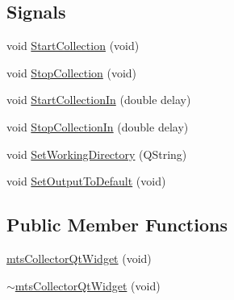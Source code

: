 \subsection*{Signals}
\begin{DoxyCompactItemize}
\item 
void \hyperlink{classmts_collector_qt_widget_a0d2f433d3246d55d80d6f35eae3799e2}{Start\+Collection} (void)
\item 
void \hyperlink{classmts_collector_qt_widget_a08ea3c401e89cc9c65f31611c3cb1b0e}{Stop\+Collection} (void)
\item 
void \hyperlink{classmts_collector_qt_widget_a4a4e7713cddf98ffc22466c9cc57d1d9}{Start\+Collection\+In} (double delay)
\item 
void \hyperlink{classmts_collector_qt_widget_add7cedb03020f4277f05996515584098}{Stop\+Collection\+In} (double delay)
\item 
void \hyperlink{classmts_collector_qt_widget_a451a4f753a956d81690518c67ed55cea}{Set\+Working\+Directory} (Q\+String)
\item 
void \hyperlink{classmts_collector_qt_widget_a381c583eb8f2acae4a7f5426cba3dd60}{Set\+Output\+To\+Default} (void)
\end{DoxyCompactItemize}
\subsection*{Public Member Functions}
\begin{DoxyCompactItemize}
\item 
\hyperlink{classmts_collector_qt_widget_a9870d591db178a3879b23f465f455307}{mts\+Collector\+Qt\+Widget} (void)
\item 
\hyperlink{classmts_collector_qt_widget_a6e1e3427d752590a08cd1e02a321a380}{$\sim$mts\+Collector\+Qt\+Widget} (void)
\end{DoxyCompactItemize}

